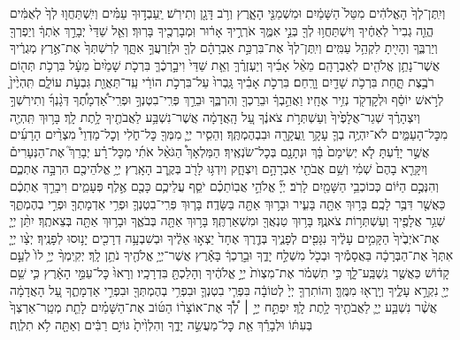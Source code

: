 \documentclass[twoside, openany, parskip=half, 11pt]{book}
\begin{document}
\begin{footnotesize}
וְיִֽתֶּן־לְךָ֙ הָאֱלֹהִ֔ים מִטַּל֙ הַשָּׁמַ֔יִם וּמִשְׁמַנֵּ֖י הָאָ֑רֶץ וְרֹ֥ב דָּגָ֖ן וְתִירֹֽשׁ׃ יַֽעַבְד֣וּךָ עַמִּ֗ים וְיִֽשְׁתַּחֲו֤וּ לְךָ֙ לְאֻמִּ֔ים הֱוֵ֤ה גְבִיר֙ לְאַחֶ֔יךָ וְיִשְׁתַּחֲו֥וּ לְךָ֖ בְּנֵ֣י אִמֶּ֑ךָ אֹרְרֶ֣יךָ אָר֔וּר וּֽמְבָרְכֶ֖יךָ בָּרֽוּךְ׃
%
וְאֵ֤ל שַׁדַּי֙ יְבָרֵ֣ךְ אֹֽתְךָ֔ וְיַפְרְךָ֖ וְיַרְבֶּ֑ךָ וְהָיִ֖יתָ לִקְהַ֥ל עַמִּֽים׃ וְיִֽתֶּן־לְךָ֙ אֶת־בִּרְכַּ֣ת אַבְרָהָ֔ם לְךָ֖ וּלְזַרְעֲךָ֣ אִתָּ֑ךְ לְרִשְׁתְּךָ֙ אֶת־אֶ֣רֶץ מְגֻרֶ֔יךָ אֲשֶׁר־נָתַ֥ן אֱלֹהִ֖ים לְאַבְרָהָֽם׃
%
מֵאֵ֨ל אָבִ֜יךָ וְיַעְזְרֶ֗ךָּ וְאֵ֤ת שַׁדַּי֙ וִיבָ֣רְכֶ֔ךָּ בִּרְכֹ֤ת שָׁמַ֙יִם֙ מֵעָ֔ל בִּרְכֹ֥ת תְּה֖וֹם רֹבֶ֣צֶת תָּ֑חַת בִּרְכֹ֥ת שָׁדַ֖יִם וָרָֽחַם׃ בִּרְכֹ֣ת אָבִ֗יךָ גָּֽבְרוּ֙ עַל־בִּרְכֹ֣ת הוֹרַ֔י עַֽד־תַּאֲוַ֖ת גִּבְעֹ֣ת עוֹלָ֑ם תִּֽהְיֶ֙יןָ֙ לְרֹ֣אשׁ יוֹסֵ֔ף וּלְקׇדְקֹ֖ד נְזִ֥יר אֶחָֽיו׃
%
וַאֲהֵ֣בְךָ֔ וּבֵרַכְךָ֖ וְהִרְבֶּ֑ךָ וּבֵרַ֣ךְ פְּרִֽי־בִטְנְךָ֣ וּפְרִֽי־אַ֠דְמָתֶ֠ךָ דְּגָ֨נְךָ֜ וְתִירֹֽשְׁךָ֣ וְיִצְהָרֶ֗ךָ שְׁגַר־אֲלָפֶ֙יךָ֙ וְעַשְׁתְּרֹ֣ת צֹאנֶ֔ךָ עַ֚ל הָֽאֲדָמָ֔ה אֲשֶׁר־נִשְׁבַּ֥ע לַאֲבֹתֶ֖יךָ לָ֥תֶת לָֽךְ׃ בָּר֥וּךְ תִּֽהְיֶ֖ה מִכׇּל־הָעַמִּ֑ים לֹא־יִהְיֶ֥ה בְךָ֛ עָקָ֥ר וַֽעֲקָרָ֖ה וּבִבְהֶמְתֶּֽךָ׃ וְהֵסִ֧יר יְיָ֛ מִמְּךָ֖ כׇּל־חֹ֑לִי וְכׇל־מַדְוֵי֩ מִצְרַ֨יִם הָרָעִ֜ים אֲשֶׁ֣ר יָדַ֗עְתָּ לֹ֤א יְשִׂימָם֙ בָּ֔ךְ וּנְתָנָ֖ם בְּכׇל־שֹׂנְאֶֽיךָ׃
%
הַמַּלְאָךְ֩ הַגֹּאֵ֨ל אֹתִ֜י מִכׇּל־רָ֗ע יְבָרֵךְ֮ אֶת־הַנְּעָרִים֒ וְיִקָּרֵ֤א בָהֶם֙ שְׁמִ֔י וְשֵׁ֥ם אֲבֹתַ֖י אַבְרָהָ֣ם וְיִצְחָ֑ק וְיִדְגּ֥וּ לָרֹ֖ב בְּקֶ֥רֶב הָאָֽרֶץ׃
%
יְיָ֥ אֱלֹהֵיכֶ֖ם הִרְבָּ֣ה אֶתְכֶ֑ם וְהִנְּכֶ֣ם הַיּ֔וֹם כְּכוֹכְבֵ֥י הַשָּׁמַ֖יִם לָרֹֽב׃ יְיָ֞ אֱלֹהֵ֣י אֲבֽוֹתֵכֶ֗ם יֹסֵ֧ף עֲלֵיכֶ֛ם כָּכֶ֖ם אֶ֣לֶף פְּעָמִ֑ים וִיבָרֵ֣ךְ אֶתְכֶ֔ם כַּאֲשֶׁ֖ר דִּבֶּ֥ר לָכֶֽם׃
%
בָּר֥וּךְ אַתָּ֖ה בָּעִ֑יר וּבָר֥וּךְ אַתָּ֖ה בַּשָּׂדֶֽה׃ בָּר֧וּךְ פְּרִֽי־בִטְנְךָ֛ וּפְרִ֥י אַדְמָתְךָ֖ וּפְרִ֣י בְהֶמְתֶּ֑ךָ שְׁגַ֥ר אֲלָפֶ֖יךָ וְעַשְׁתְּר֥וֹת צֹאנֶֽךָ׃ בָּר֥וּךְ טַנְאֲךָ֖ וּמִשְׁאַרְתֶּֽךָ׃ בָּר֥וּךְ אַתָּ֖ה בְּבֹאֶ֑ךָ וּבָר֥וּךְ אַתָּ֖ה בְּצֵאתֶֽךָ׃ יִתֵּ֨ן יְיָ֤ אֶת־אֹיְבֶ֙יךָ֙ הַקָּמִ֣ים עָלֶ֔יךָ נִגָּפִ֖ים לְפָנֶ֑יךָ בְּדֶ֤רֶךְ אֶחָד֙ יֵצְא֣וּ אֵלֶ֔יךָ וּבְשִׁבְעָ֥ה דְרָכִ֖ים יָנ֥וּסוּ לְפָנֶֽיךָ׃ יְצַ֨ו יְיָ֤ אִתְּךָ֙ אֶת־הַבְּרָכָ֔ה בַּאֲסָמֶ֕יךָ וּבְכֹ֖ל מִשְׁלַ֣ח יָדֶ֑ךָ וּבֵ֣רַכְךָ֔ בָּאָ֕רֶץ אֲשֶׁר־יְיָ֥ אֱלֹהֶ֖יךָ נֹתֵ֥ן לָֽךְ׃ יְקִֽימְךָ֨ יְיָ֥ לוֹ֙ לְעַ֣ם קָד֔וֹשׁ כַּאֲשֶׁ֖ר נִֽשְׁבַּֽע־לָ֑ךְ כִּ֣י תִשְׁמֹ֗ר אֶת־מִצְוֺת֙ יְיָ֣ אֱלֹהֶ֔יךָ וְהָלַכְתָּ֖ בִּדְרָכָֽיו׃ וְרָאוּ֙ כׇּל־עַמֵּ֣י הָאָ֔רֶץ כִּ֛י שֵׁ֥ם יְיָ֖ נִקְרָ֣א עָלֶ֑יךָ וְיָֽרְא֖וּ מִמֶּֽךָּ׃ וְהוֹתִרְךָ֤ יְיָ֙ לְטוֹבָ֔ה בִּפְרִ֧י בִטְנְךָ֛ וּבִפְרִ֥י בְהֶמְתְּךָ֖ וּבִפְרִ֣י אַדְמָתֶ֑ךָ עַ֚ל הָאֲדָמָ֔ה אֲשֶׁ֨ר נִשְׁבַּ֧ע יְיָ֛ לַאֲבֹתֶ֖יךָ לָ֥תֶת לָֽךְ׃ יִפְתַּ֣ח יְיָ֣ ׀ לְ֠ךָ֠ אֶת־אוֹצָר֨וֹ הַטּ֜וֹב אֶת־הַשָּׁמַ֗יִם לָתֵ֤ת מְטַֽר־אַרְצְךָ֙ בְּעִתּ֔וֹ וּלְבָרֵ֕ךְ אֵ֖ת כׇּל־מַעֲשֵׂ֣ה יָדֶ֑ךָ וְהִלְוִ֙יתָ֙ גּוֹיִ֣ם רַבִּ֔ים וְאַתָּ֖ה לֹ֥א תִלְוֶֽה׃

\end{footnotesize}
\end{document}
